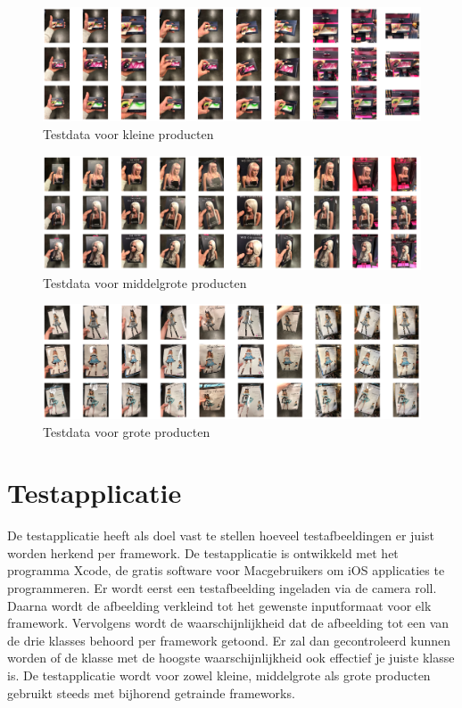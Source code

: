   \begin{figure}[h!]
    \centering
        \includegraphics[width=1\textwidth]{img/testklein.png}
    \caption{Testdata voor kleine producten}
    \label{fig:testklein}
  \end{figure}

  \begin{figure}[h!]
    \centering
        \includegraphics[width=1\textwidth]{img/testmiddel.png}
    \caption{Testdata voor middelgrote producten}
    \label{fig:testmiddel}
  \end{figure}

  \begin{figure}[h!]
    \centering
        \includegraphics[width=1\textwidth]{img/testgroot.png}
    \caption{Testdata voor grote producten}
    \label{fig:testgroot}
  \end{figure}

\section{Testapplicatie}
\label{sec:Testapplicatie}

De testapplicatie heeft als doel vast te stellen hoeveel testafbeeldingen er juist worden herkend per framework. De testapplicatie is ontwikkeld met het programma Xcode, de gratis software voor Macgebruikers om iOS applicaties te programmeren. Er wordt eerst een testafbeelding ingeladen via de camera roll. Daarna wordt de afbeelding verkleind tot het gewenste inputformaat voor elk framework. Vervolgens wordt de waarschijnlijkheid dat de afbeelding tot een van de drie klasses behoord per framework getoond. Er zal dan gecontroleerd kunnen worden of de klasse met de hoogste waarschijnlijkheid ook effectief je juiste klasse is. De testapplicatie wordt voor zowel kleine, middelgrote als grote producten gebruikt steeds met bijhorend getrainde frameworks.  
  
